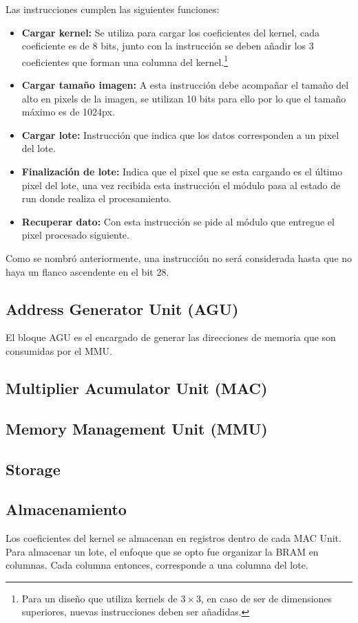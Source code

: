 Las instrucciones cumplen las siguientes funciones:

\begin{itemize}
\item \textbf{Cargar kernel:} Se utiliza para cargar los coeficientes del
  kernel, cada coeficiente es de 8 bits, junto con la instrucción se deben
  añadir los 3 coeficientes que forman una columna del kernel.\footnote{Para un
    diseño que utiliza kernels de $3\times3$, en caso de ser de dimensiones
    superiores, nuevas instrucciones deben ser añadidas.}
\item \textbf{Cargar tamaño imagen:} A esta instrucción debe acompañar el tamaño
  del alto en pixels de la imagen, se utilizan 10 bits para ello por lo que el
  tamaño máximo es de 1024px.
\item \textbf{Cargar lote:} Instrucción que indica que los datos corresponden a
  un pixel del lote.
\item \textbf{Finalización de lote:} Indica que el pixel que se esta cargando es
  el último pixel del lote, una vez recibida esta instrucción el módulo pasa al
  estado de run donde realiza el procesamiento.
\item \textbf{Recuperar dato:} Con esta instrucción se pide al módulo que
  entregue el pixel procesado siguiente.
\end{itemize}

Como se nombró anteriormente, una instrucción no será considerada hasta que no
haya un flanco ascendente en el bit 28.

\subsection{Address Generator Unit (AGU)}

El bloque AGU es el encargado de generar las direcciones de memoria que son
consumidas por el MMU.
\subsection{Multiplier Acumulator Unit (MAC)}

\subsection{Memory Management Unit (MMU)}

\subsection{Storage}
\subsection{Almacenamiento}\label{storage_subsecc}
Los coeficientes del kernel se almacenan en registros dentro de cada MAC Unit.
Para almacenar un lote, el enfoque que se opto fue organizar la BRAM en
columnas. Cada columna entonces, corresponde a una columna del lote.

